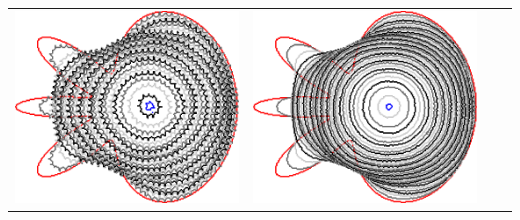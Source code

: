 \begin{frame}
\begin{tabular}{cccc}
\includegraphics[scale=0.13]{figures/non-submodular-elastica/level-effect/flower-l1.png}&
\includegraphics[scale=0.13]{figures/non-submodular-elastica/level-effect/flower-l3.png}&

\end{tabular}
\end{frame}
